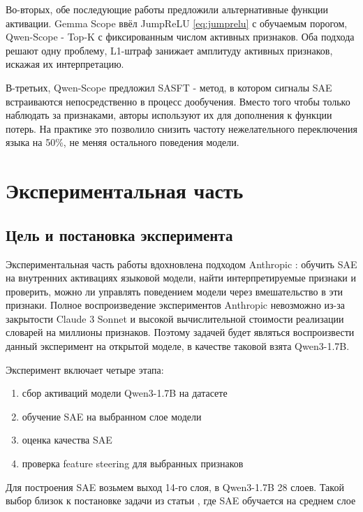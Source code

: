 \documentclass[a4paper,14pt]{extreport}
\begin{document}
Во-вторых, обе последующие работы предложили альтернативные функции активации.
Gemma Scope \cite{gemma_scope_2024} ввёл JumpReLU \eqref{eq:jumprelu} с обучаемым
порогом, Qwen-Scope \cite{qwen_scope_2026} - Top-K с фиксированным числом активных
признаков. Оба подхода решают одну проблему, L1-штраф занижает амплитуду активных
признаков, искажая их интерпретацию. 

В-третьих, Qwen-Scope предложил SASFT - метод, в котором сигналы SAE встраиваются
непосредственно в процесс дообучения. Вместо того чтобы только наблюдать за
признаками, авторы используют их для дополнения к функции потерь.
На практике это позволило снизить частоту нежелательного переключения языка
на 50\%, не меняя остального поведения модели.

\chapter{Экспериментальная часть}

\section{Цель и постановка эксперимента}

Экспериментальная часть работы вдохновлена подходом Anthropic
\cite{templeton2024scaling}: обучить SAE на внутренних активациях языковой модели,
найти интерпретируемые признаки и проверить, можно ли управлять поведением модели
через вмешательство в эти признаки. Полное воспроизведение экспериментов Anthropic
невозможно из-за закрытости Claude 3 Sonnet и высокой вычислительной стоимости реализации
словарей на миллионы признаков. Поэтому задачей будет являться
воспроизвести данный эксперимент на открытой моделе, в качестве таковой взята Qwen3-1.7B.

Эксперимент включает четыре этапа:
\begin{enumerate}
    \item сбор активаций модели Qwen3-1.7B на датасете
    \item обучение SAE на выбранном слое модели
    \item оценка качества SAE
    \item проверка feature steering для выбранных признаков
\end{enumerate}

Для построения SAE возьмем выход 14-го слоя, в Qwen3-1.7B 28 слоев. 
Такой выбор близок к постановке задачи из статьи
\cite{templeton2024scaling}, где SAE обучается на среднем слое
\end{document}
